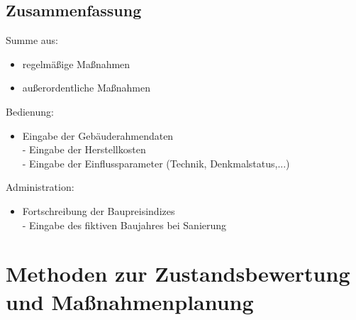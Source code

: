 \documentclass[fleqn,twoside,dvipsnames]{article}
\begin{document}
    \subsection{Zusammenfassung}
        Summe aus:
            \begin{itemize}
                \item regelmäßige Maßnahmen
                \item außerordentliche Maßnahmen
            \end{itemize}
        Bedienung:
            \begin{itemize}
                \item Eingabe der Gebäuderahmendaten \\
                - Eingabe der Herstellkosten\\
                - Eingabe der Einflussparameter (Technik, Denkmalstatus,...)
            \end{itemize}
        Administration:
            \begin{itemize}
                \item Fortschreibung der Baupreisindizes\\
                - Eingabe des fiktiven Baujahres bei Sanierung
            \end{itemize}

\newpage

\section{Methoden zur Zustandsbewertung und Maßnahmenplanung } \label{Zustandsbewertung}
\end{document}
